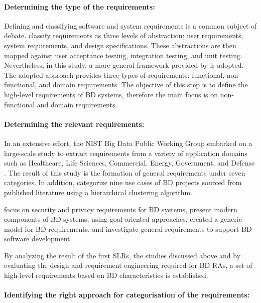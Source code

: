 \documentclass[preprint,12pt]{elsarticle}
\begin{document}
\paragraph{Determining the type of the requirements:}

Defining and classifying software and system requirements is a common subject of debate. \citeauthor{sommerville2011software}\cite{sommerville2011software} classify requirements as three levels of abstraction; user requirements, system requirements, and design specifications. These abstractions are then mapped against user acceptance testing, integration testing, and unit testing. Nevertheless, in this study, a more general framework provided by \citeauthor{laplante2017requirements} is adopted. The adopted approach provides three types of requirements: functional, non-functional, and domain requirements. The objective of this step is to define the high-level requirements of BD systems, therefore the main focus is on non-functional and domain requirements. 

\paragraph{Determining the relevant requirements:}

In an extensive effort, the NIST Big Data Public Working Group embarked on a large-scale study to extract requirements from a variety of application domains such as Healthcare, Life Sciences, Commercial, Energy, Government, and Defense \cite{Chang}. The result of this study is the formation of general requirements under seven categories. In addition, \citeauthor{volk2020identifying} categorize nine use cases of BD projects sourced from published literature using a hierarchical clustering algorithm. 

\citeauthor{AtaeiSecurity}\cite{AtaeiSecurity} focus on security and privacy requirements for BD systems, \citeauthor{yu2019components} present modern components of BD systems, using goal-oriented approaches, \citeauthor{eridaputra2014modeling} created a generic model for BD requirements, and  \citeauthor{al2016characteristics} investigate general requirements to support BD software development. 

By analyzing the result of the first SLRs, the studies discussed above and by evaluating the design and requirement engineering required for BD RAs, a set of high-level requirements based on BD characteristics is established. 

\paragraph{Identifying the right approach for categorisation of the requirements:}
\end{document}
